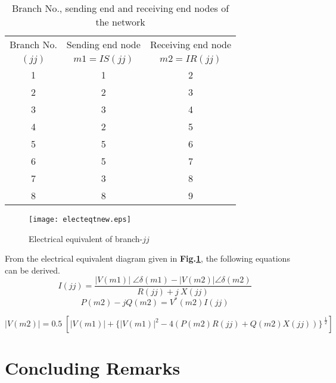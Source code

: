 \documentclass[a4paper,12pt,oneside]{report}%
\begin{document}
\begin{table}[!h]
\caption{Branch No., sending end and receiving end nodes of the
network} \label{table_brnodeno} \centering
\begin{tabular}{|c|c|c|}
\hline
 Branch No.& Sending end node & Receiving end node\\
$(jj)$ & $m1=IS(jj)$ & $m2=IR(jj)$\\
\hline
1 & 1 & 2\\
2 & 2 & 3\\
3 & 3 & 4\\
4 & 2 & 5\\
5 & 5 & 6\\
6 & 5 & 7\\
7 & 3 & 8\\
8 & 8 & 9\\
\hline
\end{tabular}
\end{table}

\begin{figure}[!b]
\centering
 \texttt{[image: electeqtnew.eps]}
\caption{Electrical equivalent of branch-$jj$} \label{figure_branch}
\end{figure}

From the electrical equivalent diagram given in \textbf{Fig.\ref{figure_branch}}, the following equations can be derived.
\vspace{0.1in}
\begin{equation}
I(jj)=\frac{|V(m1)|\;\angle\delta(m1)-|V(m2)|\angle\delta(m2)}{R(jj)+j\:X(jj)}
 \label{eq_curr}
 \end{equation}
\vspace{-0.04in}
\begin{equation}
P(m2)-jQ(m2)=V^*(m2)I(jj)
 \label{eq_pow}
 \end{equation}

\begin{equation}
|V(m2)|=0.5\;[|V(m1)|+\{|V(m1)|^{2}-4(P(m2)R(jj)+Q(m2)X(jj))\}^{\;\frac{1}{2}}]
 \label{eq_volt}
 \end{equation}

\section {Concluding  Remarks}
\end{document}
